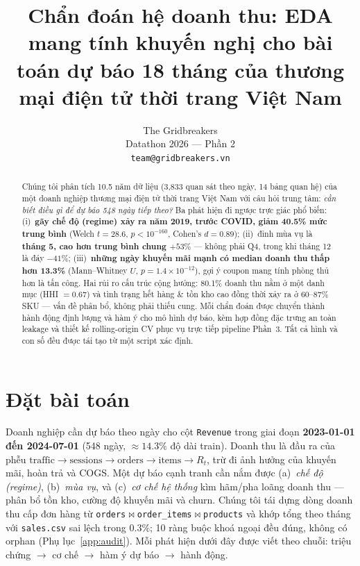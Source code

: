 \documentclass{article}
\title{Chẩn đoán hệ doanh thu: EDA mang tính khuyến nghị cho bài toán dự báo 18 tháng của thương mại điện tử thời trang Việt Nam}
\author{%
  The Gridbreakers \\
  Datathon 2026 --- Phần 2 \\
  \texttt{team@gridbreakers.vn} \\
}
\begin{document}
\maketitle

\begin{abstract}
Chúng tôi phân tích 10.5 năm dữ liệu (3{,}833 quan sát theo ngày, 14 bảng quan hệ) của một doanh nghiệp thương mại điện tử thời trang Việt Nam với câu hỏi trung tâm: \emph{cần biết điều gì để dự báo 548 ngày tiếp theo?} Ba phát hiện đi ngược trực giác phổ biến: (i)~\textbf{gãy chế độ (regime) xảy ra năm 2019, trước COVID, giảm 40.5\% mức trung bình} (Welch $t{=}28.6$, $p{<}10^{-160}$, Cohen's $d{=}0.89$); (ii)~đỉnh mùa vụ là \textbf{tháng 5, cao hơn trung bình chung $+53\%$} --- không phải Q4, trong khi tháng 12 là đáy $-41\%$; (iii)~\textbf{những ngày khuyến mãi mạnh có median doanh thu thấp hơn 13.3\%} (Mann--Whitney $U$, $p{=}1.4\times10^{-12}$), gợi ý coupon mang tính phòng thủ hơn là tấn công. Hai rủi ro cấu trúc cộng hưởng: 80.1\% doanh thu nằm ở một danh mục (HHI $=0.67$) và tình trạng hết hàng \& tồn kho cao đồng thời xảy ra ở 60--87\% SKU --- vấn đề phân bổ, không phải thiếu cung. Mỗi chẩn đoán được chuyển thành hành động định lượng và hàm ý cho mô hình dự báo, kèm hợp đồng đặc trưng an toàn leakage và thiết kế rolling-origin CV phục vụ trực tiếp pipeline Phần~3. Tất cả hình và con số đều được tái tạo từ một script xác định.
\end{abstract}

\vspace{-6pt}
\section{Đặt bài toán}
\label{sec:framing}
\vspace{-2pt}

Doanh nghiệp cần dự báo theo ngày cho cột \texttt{Revenue} trong giai đoạn \textbf{2023-01-01 đến 2024-07-01} (548 ngày, $\approx14.3\%$ độ dài train). Doanh thu là đầu ra của phễu $\text{traffic} \to \text{sessions} \to \text{orders} \to \text{items} \to R_t$, trừ đi ảnh hưởng của khuyến mãi, hoàn trả và COGS. Một dự báo cạnh tranh cần nắm được (a)~\emph{chế độ (regime)}, (b)~\emph{mùa vụ}, và (c)~\emph{cơ chế hệ thống} kìm hãm/pha loãng doanh thu --- phân bổ tồn kho, cường độ khuyến mãi và churn. Chúng tôi tái dựng dòng doanh thu cấp đơn hàng từ \texttt{orders}$\bowtie$\texttt{order\_items}$\bowtie$\texttt{products} và khớp tổng theo tháng với \texttt{sales.csv} sai lệch trong 0.3\%; 10 ràng buộc khoá ngoại đều đúng, không có orphan (Phụ lục~\ref{app:audit}). Mỗi phát hiện dưới đây được viết theo chuỗi: triệu chứng $\to$ cơ chế $\to$ hàm ý dự báo $\to$ hành động.
\end{document}
